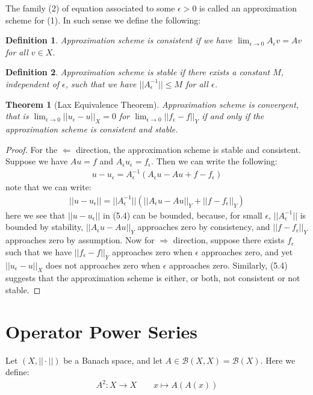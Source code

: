\documentclass[11pt]{book}
\theoremstyle{break}
\theoremstyle{break}
\newtheorem{thm}{Theorem}[section]
\newtheorem{defn}{Definition}[corL]
\begin{document}
The family (2) of equation associated to some $\epsilon > 0$ is called an approximation scheme for (1). In such sense we define the following:
\begin{defn}
Approximation scheme is consistent if we have $\lim_{\epsilon \to 0}A_\epsilon v = Av$ for all $v \in X$.  
\end{defn}
\begin{defn}
Approximation scheme is stable if there exists a constant $M$, independent of $\epsilon$, such that we have $||A_{\epsilon}^{-1}|| \leq M$ for all $\epsilon$. 
\end{defn}
\begin{thm}[Lax Equivalence Theorem]
Approximation scheme is convergent, that is $\lim_{\epsilon \to 0}||u_\epsilon- u||_X = 0$ for $\lim_{\epsilon \to 0}||f_{\epsilon} - f||_Y$ if and only if the approximation scheme is consistent and stable. 
\end{thm}
\begin{proof}
For the $\Leftarrow$ direction, the approximation scheme is stable and consistent. Suppose we have $Au = f$ and $A_{\epsilon} u_\epsilon = f_\epsilon$. Then we can write the following:
\begin{align*}
u - u_\epsilon = A_\epsilon^{-1}\left( A_\epsilon u - Au + f - f_\epsilon\right)
\end{align*}
note that we can write:
\begin{align}
||u - u_\epsilon|| = ||A_\epsilon^{-1}|| \left( ||A_\epsilon u - Au ||_Y + ||f-f_\epsilon||_Y\right)
\end{align}
here we see that $||u-u_\epsilon||$ in (5.4) can be bounded, because, for small $\epsilon$, $||A_{\epsilon}^{-1}||$ is bounded by stability, $||A_\epsilon u - Au||_Y$ approaches zero by consistency, and $||f - f_\epsilon||_Y$ approaches zero by assumption. Now for $\Rightarrow$ direction, suppose there exists $f_\epsilon$ such that we have $||f_\epsilon -f||_Y $ approaches zero when $\epsilon $ approaches zero, and yet $||u_\epsilon - u||_X$ does not approaches zero when $\epsilon$ approaches zero. Similarly, (5.4) suggests that the approximation scheme is either, or both, not consistent or not stable. 
\end{proof}

\newpage
\section[Operator Power Series]{\color{red}Operator Power Series\color{black}}
Let $(X, ||\cdot ||)$ be a Banach space, and let $A \in \mathcal{B}(X,X) = \mathcal{B}(X)$. Here we define:
\begin{align*}
A^2:X \to X \qquad x\mapsto A(A(x))
\end{align*}
\end{document}
